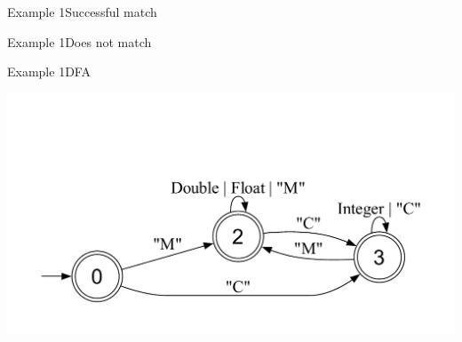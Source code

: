 \newsavebox\exampleAbbox
\begin{lrbox}{\exampleAbbox}
  \begin{minipage}{12cm}
    
  \end{minipage}
\end{lrbox}



\begin{frame}{Example 1}{Successful match}
  \usebox\exampleAbbox
\end{frame}

\newsavebox\exampleAcbox
\begin{lrbox}{\exampleAcbox}
  \begin{minipage}{12cm}
    
  \end{minipage}
\end{lrbox}



\begin{frame}{Example 1}{Does not match}
  \usebox\exampleAcbox
\end{frame}

\newsavebox\exampleAdbox
\begin{lrbox}{\exampleAdbox}
  \begin{minipage}{12cm}
    
  \end{minipage}
\end{lrbox}


\begin{frame}{Example 1}{DFA}
  \usebox\exampleAdbox
  
  \includegraphics[height=0.5\textheight,trim = {1.8cm 1.0cm 0 3.5cm}, clip]{example2.pdf}
\end{frame}
